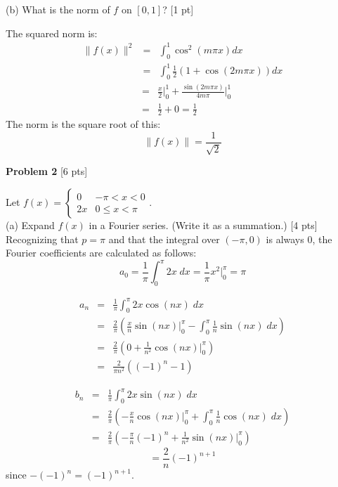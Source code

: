 \documentclass[11pt]{article}
\begin{document}
(b) What is the norm of $f$ on $[0, 1]$? [1 pt]

The squared norm is:
\begin{eqnarray*}
\lVert f(x) \rVert^2 &=& \int_0^1 \cos^2(m \pi x) dx \\
	&=& \int_0^1 \frac{1}{2} \left( 1 + \cos(2 m \pi x) \right) dx
\end{eqnarray*}
\begin{eqnarray*}
	&=& \frac{x}{2} \biggr\rvert_0^1 + \frac{\sin(2 m \pi x)}{4 m \pi} \biggr\rvert_0^1 \\
	&=& \frac{1}{2} + 0 = \frac{1}{2}
\end{eqnarray*}
The norm is the square root of this:
\begin{equation*}
\lVert f(x) \rVert = \frac{1}{\sqrt{2}}
\end{equation*}

\vspace{0.5in}

\textbf{Problem 2} [6 pts]

\vspace{0.1in}

Let $f(x) = \begin{cases} 0 & -\pi < x < 0 \\  2x & 0 \leq x < \pi \end{cases}$. \\

(a) Expand $f(x)$ in a Fourier series. (Write it as a summation.) [4 pts] \\

Recognizing that $p = \pi$ and that the integral over $(-\pi, 0)$ is always $0$, the Fourier coefficients are calculated as follows:
\begin{equation*}
a_0 = \frac{1}{\pi} \int_0^{\pi} 2x \; dx = \frac{1}{\pi} x^2 \biggr\rvert_0^{\pi} = \pi
\end{equation*}

\begin{eqnarray*}
a_n &=& \frac{1}{\pi} \int_0^{\pi} 2x \cos( nx) \; dx \\
	&=& \frac{2}{\pi} \left( \frac{x}{n} \sin( nx) \biggr\rvert_0^{\pi} - \int_0^{\pi} \frac{1}{n} \sin( nx) \; dx \right) \\
	&=& \frac{2}{\pi} \left( 0 + \frac{1}{n^2} \cos( nx) \biggr\rvert_0^{\pi} \right) \\
	&=& \frac{2}{\pi n^2} \left( (-1)^n - 1 \right)
\end{eqnarray*}

\begin{eqnarray*}
b_n &=& \frac{1}{\pi} \int_0^{\pi} 2x \sin( nx) \; dx \\
	&=& \frac{2}{\pi} \left( - \frac{x}{n} \cos( nx) \biggr\rvert_0^{\pi} + \int_0^{\pi} \frac{1}{n} \cos( nx) \; dx \right) \\
	&=& \frac{2}{\pi} \left( - \frac{\pi}{n} (-1)^n + \frac{1}{n^2} \sin( nx) \biggr\rvert_0^{\pi} \right)
\end{eqnarray*}
\begin{equation*}
	= \frac{2}{n} (-1)^{n+1}
\end{equation*}
since $-(-1)^{n} = (-1)^{n+1}$. \\
\end{document}
